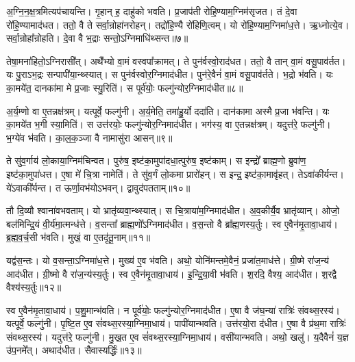 अ॒ग्नि॒न॒क्ष॒त्रमित्यप॑चायन्ति।
गृ॒हान् ह॒ दाहु॑को भवति।
प्र॒जा\-प॑ती रोहि॒ण्याम॒ग्निम॑\-सृजत।
तं दे॒वा रो॑हि॒ण्यामाद॑धत।
ततो॒ वै ते सर्वा॒न्रोहा॑नरोहन्।
तद्रो॑हि॒ण्यै रो॑हिणि॒त्वम्।
यो रो॑हि॒ण्याम॒ग्निमा॑ध॒त्ते।
ऋ॒ध्नोत्ये॒व।
सर्वा॒न्रोहा᳚न्रोहति।
दे॒वा वै भ॒द्राः सन्तो॒\-ऽग्निमाधि॑थ्सन्त॥७॥\ip

तेषा॒मना॑हितो॒\-ऽग्निरासी᳚त्।
अथै᳚भ्यो वा॒मं वस्वपा᳚क्रामत्।
ते पुन॑र्वस्वो॒राद॑धत।
ततो॒ वै तान् वा॒मं वसू॒पाव॑र्तत।
यः पु॒राऽभ॒द्रः सन्पापी॑या॒न्थ्स्यात्।
स पुन॑र्वस्वोर॒ग्निमाद॑धीत।
पुन॑रे॒वैनं॑ वा॒मं वसू॒पाव॑र्तते।
भ॒द्रो भ॑वति।
यः का॒मये॑त॒ दानका॑मा मे प्र॒जाः स्यु॒रिति॑।
स पूर्व॑योः॒ फल्गु॑न्योर॒ग्निमाद॑धीत॥८॥\ip

अ॒र्य॒म्णो वा ए॒तन्नक्ष॑त्रम्।
यत्पूर्वे॒ फल्गु॑नी।
अ॒र्य॒मेति॒ तमा॑हु॒र्यो ददा॑ति।
दान॑कामा अस्मै प्र॒जा भ॑वन्ति।
यः का॒मये॑त भ॒गी स्या॒मिति॑।
स उत्त॑रयोः॒ फल्गु॑न्योर॒ग्निमाद॑धीत।
भग॑स्य॒ वा ए॒तन्नक्ष॑त्रम्।
यदुत्त॑रे॒ फल्गु॑नी।
भ॒ग्ये॑व भ॑वति।
का॒ल॒क॒ञ्जा वै नामासु॑रा आसन्॥९॥\ip

ते सु॑व॒र्गाय॑ लो॒काया॒ग्निम॑चिन्वत।
पुरु॑ष॒ इष्ट॑का॒मुपा॑दधा॒त्\-पुरु॑ष॒ इष्ट॑काम्।
स इन्द्रो᳚ ब्राह्म॒णो ब्रुवा॑ण॒ इष्ट॑का॒मुपा॑धत्त।
ए॒षा मे॑ चि॒त्रा नामेति॑।
ते सु॑व॒र्गं लो॒कमा प्रारो॑हन्।
स इन्द्र॒ इष्ट॑का॒मावृ॑हत्।
तेऽवा॑कीर्यन्त।
ये॑ऽवाकी᳚र्यन्त।
त ऊर्णा॒वभ॑यो\-ऽभवन्।
द्वावुद॑पतताम्॥१०॥\ip

तौ दि॒व्यौ श्वाना॑वभवताम्।
यो भ्रातृ॑व्यवा॒न्थ्स्यात्।
स चि॒त्राया॑म॒ग्निमाद॑धीत।
अ॒व॒कीर्यै॒व भ्रातृ॑व्यान्।
ओजो॒ बल॑मिन्द्रि॒यं वी॒र्य॑मा॒त्मन्ध॑त्ते।
व॒सन्ता᳚ ब्राह्म॒णो᳚\-ऽग्निमाद॑धीत।
व॒स॒न्तो वै ब्रा᳚ह्म॒णस्य॒र्तुः।
स्व ए॒वैन॑मृ॒तावा॒धाय॑।
ब्र॒ह्म॒व॒र्च॒सी भ॑वति।
मुखं॒ वा ए॒तदृ॑तू॒नाम्॥११॥\ip

यद्व॑स॒न्तः।
यो व॒सन्ता॒\-ऽग्निमा॑ध॒त्ते।
मुख्य॑ ए॒व भ॑वति।
अथो॒ योनि॑मन्तमे॒वैनं॒ प्रजा॑त॒माध॑त्ते।
ग्री॒ष्मे रा॑ज॒न्य॑ आद॑धीत।
ग्री॒ष्मो वै रा॑ज॒न्य॑स्य॒र्तुः।
स्व ए॒वैन॑मृ॒तावा॒धाय॑।
इ॒न्द्रि॒या॒वी भ॑वति।
श॒रदि॒ वैश्य॒ आद॑धीत।
श॒रद्वै वैश्य॑स्य॒र्तुः॥१२॥\ip

स्व ए॒वैन॑मृ॒तावा॒धाय॑।
प॒शु॒मान्भ॑वति।
न पूर्व॑योः॒ फल्गु॑न्योर॒ग्निमाद॑धीत।
ए॒षा वै ज॑घ॒न्या॑ रात्रिः॑ संवथ्स॒रस्य॑।
यत्पूर्वे॒ फल्गु॑नी।
पृ॒ष्टि॒त ए॒व सं॑वथ्स॒रस्या॒ग्निमा॒धाय॑।
पापी॑यान्भवति।
उत्त॑रयो॒रा द॑धीत।
ए॒षा वै प्र॑थ॒मा रात्रिः॑ संवथ्स॒रस्य॑।
यदुत्त॑रे॒ फल्गु॑नी।
मु॒ख॒त ए॒व सं॑वथ्स॒रस्या॒ग्निमा॒धाय॑।
वसी॑यान्भवति।
अथो॒ खलु॑।
य॒दैवैनं॑ य॒ज्ञ उ॑प॒नमे᳚त्।
अथाद॑धीत।
सैवास्यर्द्धिः॑॥१३॥\ip\anuvakamend[खल्वा॑धिथ्सन्त॒ फल्गु॑न्योर॒ग्निमाद॑धीतासन्नपततामृतू॒नां वैश्य॑स्य॒र्तुरुत्त॑रे॒ फल्गु॑नी॒ षट्च॑]

